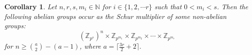 \documentclass[preprint,sort&compress,12pt]{elsarticle}
\newtheorem{corollary}[theorem]{Corollary}
\numberwithin{equation}{section}
\theoremstyle{definition}
\newcommand{\Z}{\mathbb{Z}}
\begin{document}
\begin{corollary} \label{values of n}
Let $n,r,s,m_i \in \mathbb{N}$  for $i \in \{1,2,\cdots r\}$ such that    ${0 < m_i < s}$. Then the following abelian groups  occur as the Schur multiplier of some non-abelian groups:
     $$(\Z_{p^s})^n \times \Z_{p^{m_1}} \times \Z_{p^{m_2}} \times \cdots \times \Z_{p^{m_r}}$$ 
for
$n \ge \binom{a}{2}-(a-1)$, where $a=\lceil\frac{3r}{2}+2\rceil.$




\end{corollary}
\end{document}

